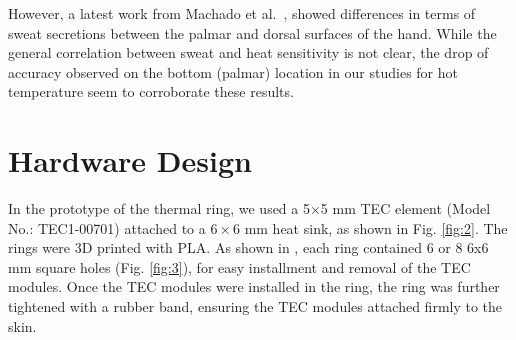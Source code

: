 \documentclass[preprint,12pt]{elsarticle}
\begin{document}
However, a latest work from Machado et al.~\cite{Machado2008}, showed differences in terms of sweat secretions between the palmar and dorsal surfaces of the hand.
While the general correlation between sweat and heat sensitivity is not clear, the drop of accuracy observed on the bottom (palmar) location in our studies for hot temperature seem to corroborate these results.




\section{Hardware Design}


In the prototype of the thermal ring, we used a 5×5 mm TEC element (Model No.: TEC1-00701) attached to a $6 \times 6$ mm heat sink, as shown in Fig. \ref{fig:2}.  The rings were 3D printed with PLA. As shown in , each ring contained 6 or 8 6x6 mm square holes (Fig. \ref{fig:3}), for easy installment and removal of the TEC modules. Once the TEC modules were installed in the ring, the ring was further tightened with a rubber band, ensuring the TEC modules attached firmly to the skin.
\end{document}
